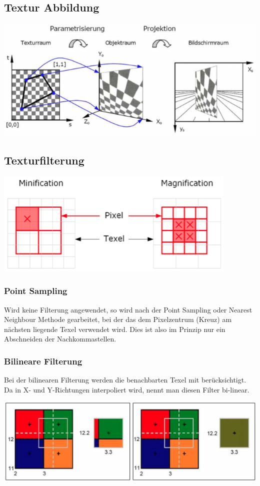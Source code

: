 \documentclass[10pt]{article}
\begin{document}
\subsection{Textur Abbildung}
\begin{center}
	\includegraphics[scale=0.4]{textur_abbildung.png}
\end{center}
\subsection{Texturfilterung}
\begin{center}
	\includegraphics[scale=0.4]{texture_sampling.png}
\end{center}
\subsubsection{Point Sampling}
Wird keine Filterung angewendet, so wird nach der Point Sampling oder Nearest Neighbour Methode gearbeitet, bei der das dem Pixelzentrum (Kreuz) am nächsten liegende Texel verwendet wird. Dies ist also im Prinzip nur ein Abschneiden der Nachkommastellen.
\subsubsection{Bilineare Filterung}
Bei der bilinearen Filterung werden die benachbarten Texel mit berücksichtigt. Da in X- und Y-Richtungen interpoliert wird, nennt man diesen Filter bi-linear.
\begin{center}
	\includegraphics[scale=0.4]{bilineare_filterung.png}
\end{center}
\end{document}
